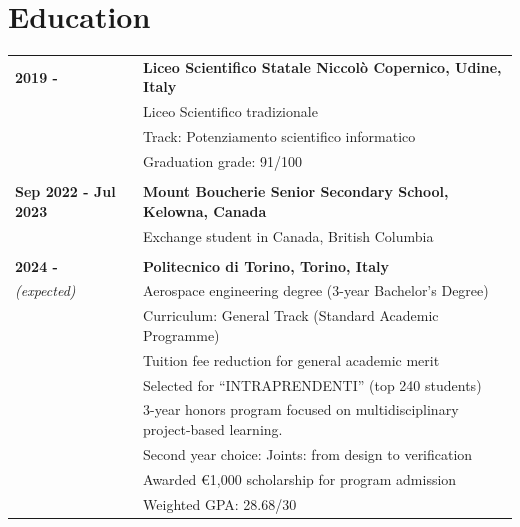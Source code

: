 \documentclass[
	11pt, %
]{resume} %
\begin{document}

\section*{Education}
\begin{longtable}{@{} p{3.5cm} p{11.5cm} @{}}

\textbf{2019 - \newline 2024} & \textbf{Liceo Scientifico Statale Niccolò Copernico, Udine, Italy} \\
    & Liceo Scientifico tradizionale \\
    & Track: Potenziamento scientifico informatico \\
    & Graduation grade: 91/100 \\

\multicolumn{2}{c}{} \\ %

\textbf{Sep 2022 - \newline Jul 2023} & \textbf{Mount Boucherie Senior Secondary School, Kelowna, Canada} \\
    & Exchange student in Canada, British Columbia \\

\multicolumn{2}{c}{} \\ %

\textbf{2024 - \newline 2027} & \textbf{Politecnico di Torino, Torino, Italy} \\
\textit{(expected)}  
    & Aerospace engineering degree (3-year Bachelor's Degree) \\
    & Curriculum: General Track (Standard Academic Programme) \\
    & \textbullet{} Tuition fee reduction for general academic merit \\
    & Selected for ``INTRAPRENDENTI'' (top 240 students) \\
    & \textbullet{} 3-year honors program focused on multidisciplinary project-based learning. \\
    & \textbullet{} Second year choice: Joints: from design to verification \\
    & \textbullet{} Awarded €1,000 scholarship for program admission \\
    & Weighted GPA: 28.68/30 \\

\end{longtable}
\end{document}
